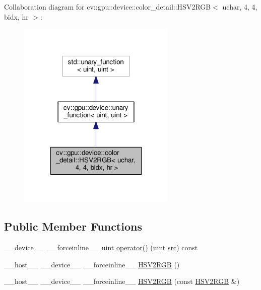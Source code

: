 Collaboration diagram for cv\-:\-:gpu\-:\-:device\-:\-:color\-\_\-detail\-:\-:H\-S\-V2\-R\-G\-B$<$ uchar, 4, 4, bidx, hr $>$\-:\nopagebreak
\begin{figure}[H]
\begin{center}
\leavevmode
\includegraphics[width=214pt]{structcv_1_1gpu_1_1device_1_1color__detail_1_1HSV2RGB_3_01uchar_00_014_00_014_00_01bidx_00_01hr_01_4__coll__graph}
\end{center}
\end{figure}
\subsection*{Public Member Functions}
\begin{DoxyCompactItemize}
\item 
\-\_\-\-\_\-device\-\_\-\-\_\- \-\_\-\-\_\-forceinline\-\_\-\-\_\- uint \hyperlink{structcv_1_1gpu_1_1device_1_1color__detail_1_1HSV2RGB_3_01uchar_00_014_00_014_00_01bidx_00_01hr_01_4_a970a4ea0b3e6f31f591fe87df0d11b18}{operator()} (uint \hyperlink{legacy_8hpp_a371cd109b74033bc4366f584edd3dacc}{src}) const 
\item 
\-\_\-\-\_\-host\-\_\-\-\_\- \-\_\-\-\_\-device\-\_\-\-\_\- \-\_\-\-\_\-forceinline\-\_\-\-\_\- \hyperlink{structcv_1_1gpu_1_1device_1_1color__detail_1_1HSV2RGB_3_01uchar_00_014_00_014_00_01bidx_00_01hr_01_4_af6373c32fb3c2d0b6daea38f3c804980}{H\-S\-V2\-R\-G\-B} ()
\item 
\-\_\-\-\_\-host\-\_\-\-\_\- \-\_\-\-\_\-device\-\_\-\-\_\- \-\_\-\-\_\-forceinline\-\_\-\-\_\- \hyperlink{structcv_1_1gpu_1_1device_1_1color__detail_1_1HSV2RGB_3_01uchar_00_014_00_014_00_01bidx_00_01hr_01_4_acfcf2d1c96e6da9a0bfb892135e41c25}{H\-S\-V2\-R\-G\-B} (const \hyperlink{structcv_1_1gpu_1_1device_1_1color__detail_1_1HSV2RGB}{H\-S\-V2\-R\-G\-B} \&)
\end{DoxyCompactItemize}



